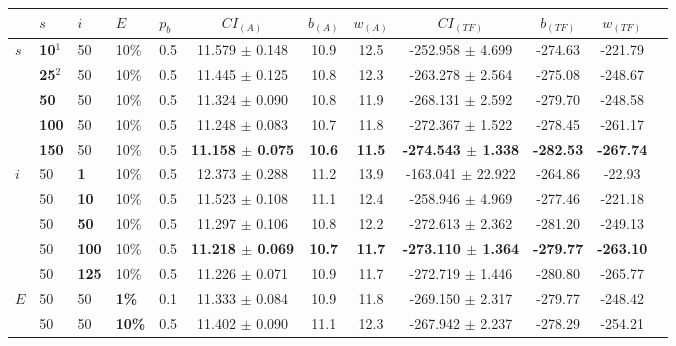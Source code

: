 \begin{sidewaystable}
    \begin{tabular}{|l|l|l|l|l||c|c|c|c|c|c|c|}
    \hline
    ~ & $s$ & $i$ & $E$ & $p_{b}$ & $CI_{(A)}$ & $b_{(A)}$ & $w_{(A)}$ & $CI_{(TF)}$ & $b_{(TF)}$ & $w_{(TF)}$\\
    \hline
      $s$ & \textbf{10$^1$} & 50 & 10\% & 0.5 & 11.579 $\pm$ 0.148 & 10.9 & 12.5 & -252.958 $\pm$ 4.699& -274.63& -221.79 \\
    ~ & \textbf{25$^2$} & 50 & 10\% & 0.5  & 11.445 $\pm$ 0.125 & 10.8 & 12.3 & -263.278 $\pm$ 2.564 & -275.08 & -248.67  \\
    ~ & \textbf{50} & 50 & 10\% & 0.5  & 11.324 $\pm$ 0.090 & 10.8 & 11.9 & -268.131 $\pm$ 2.592 & -279.70 & -248.58\\
    ~ & \textbf{100} & 50 & 10\% & 0.5 & 11.248 $\pm$ 0.083 & 10.7 & 11.8 & -272.367 $\pm$ 1.522 & -278.45 & -261.17\\
    ~ & \textbf{150} & 50 & 10\% & 0.5  & \textbf{11.158 $\pm$ 0.075} & \textbf{10.6} & \textbf{11.5} & \textbf{-274.543 $\pm$ 1.338} & \textbf{-282.53} & \textbf{-267.74}\\
    \hline
    $i$ & 50 & \textbf{1} & 10\% & 0.5  & 12.373 $\pm$ 0.288 & 11.2 & 13.9& -163.041 $\pm$ 22.922 & -264.86 & -22.93  \\
    ~   & 50 &\textbf{10} & 10\% & 0.5  & 11.523 $\pm$ 0.108 & 11.1 & 12.4 & -258.946 $\pm$ 4.969 & -277.46& -221.18 \\
    ~   & 50 &\textbf{50} & 10\% & 0.5  & 11.297 $\pm$ 0.106 & 10.8 & 12.2 & -272.613 $\pm$ 2.362 & -281.20 & -249.13 \\
    ~   & 50 &\textbf{100} & 10\% & 0.5 & \textbf{11.218 $\pm$ 0.069} & \textbf{10.7} & \textbf{11.7} & \textbf{-273.110 $\pm$ 1.364} & \textbf{-279.77} & \textbf{-263.10} \\
    ~   & 50 &\textbf{125} & 10\% & 0.5 & 11.226 $\pm$ 0.071 & 10.9 & 11.7 & -272.719 $\pm$ 1.446 & -280.80 & -265.77  \\
    \hline
    $E$ & 50 & 50 & \textbf{1\%} & 0.1 & 11.333 $\pm$ 0.084 & 10.9 & 11.8 & -269.150 $\pm$ 2.317 & -279.77 & -248.42 \\
    ~ & 50 & 50 & \textbf{10\%} & 0.5 & 11.402 $\pm$ 0.090 & 11.1 & 12.3 & -267.942 $\pm$ 2.237 & -278.29 & -254.21 \\

\end{tabular}
\end{sidewaystable}
